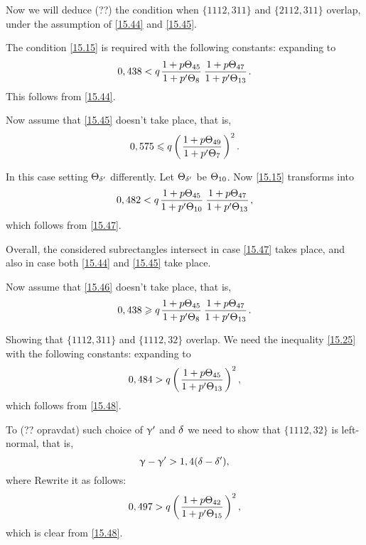 Now we will deduce (??) the condition when $\{1112, 311\}$ and $\{2112, 311\}$ overlap,
under the assumption of \ref{15.44} and \ref{15.45}.

The condition \ref{15.15} is required with the following constants:
expanding to
\begin{equation}\label{15.46}
	0,438 < q \up{45}{8} \up{47}{13}.
\end{equation}
This follows from \ref{15.44}.

Now assume that \ref{15.45} doesn't take place, that is,
\begin{equation}\label{15.47}
	0,575 \leqslant q \left(\mkern 2mu \dfrac{1 + {p} \Theta_{49}}{1 + {p'} \Theta_{7}} \mkern 2mu\right)^2.
\end{equation}

In this case setting $\Theta_{\delta'}$ differently.
Let $\Theta_{\delta'}$ be $\Theta_{10}$. Now \ref{15.15} transforms into
\begin{equation*}
	0,482 < q \up{45}{10} \up{47}{13},
\end{equation*}
which follows from \ref{15.47}.

Overall, the considered subrectangles intersect in case \ref{15.47} takes place,
and also in case both \ref{15.44} and \ref{15.45} take place.

Now assume that \ref{15.46} doesn't take place, that is,
\begin{equation}\label{15.48}
	0,438 \geqslant q \up{45}{8} \up{47}{13}.
\end{equation}

Showing that $\{1112, 311\}$ and $\{1112, 32\}$ overlap.
We need the inequality \ref{15.25} with the following constants:
expanding to
\begin{equation*}
	0,484 > q \left(\mkern 2mu \dfrac{1 + {p} \Theta_{45}}{1 + {p'} \Theta_{13}} \mkern 2mu\right)^2,
\end{equation*}
which follows from \ref{15.48}.

To (?? opravdat) such choice of $\upgamma'$ and $\delta$ we need to show that $\{1112, 32\}$ is left-normal, that is,
\begin{equation*}
	\upgamma - \upgamma' > 1,4 (\delta - \delta'),
\end{equation*}
where
Rewrite it as follows:
\begin{equation*}
	0,497 > q \left(\mkern 2mu \dfrac{1 + {p} \Theta_{42}}{1 + {p'} \Theta_{15}} \mkern 2mu\right)^2,
\end{equation*}
which is clear from \ref{15.48}.

